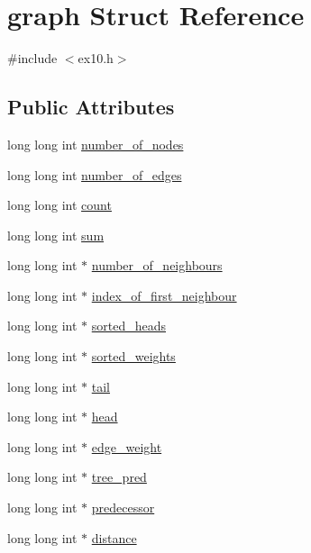 \hypertarget{structgraph}{\section{graph Struct Reference}
\label{structgraph}
}


{\ttfamily \#include $<$ex10.\+h$>$}

\subsection*{Public Attributes}
\begin{DoxyCompactItemize}
\item 
long long int \hyperlink{structgraph_a4aea87ae37b169f48f70435db134d4fd}{number\+\_\+of\+\_\+nodes}
\item 
long long int \hyperlink{structgraph_ac0108c6c9e85e0b713e90dd56ae9baaf}{number\+\_\+of\+\_\+edges}
\item 
long long int \hyperlink{structgraph_a55accd4efc16514596b2831432af4d61}{count}
\item 
long long int \hyperlink{structgraph_a517aeb6e7e14febc089e69d578ab8a17}{sum}
\item 
long long int $\ast$ \hyperlink{structgraph_a4c22b3b81cf0963d8f0fbbe2b1318b67}{number\+\_\+of\+\_\+neighbours}
\item 
long long int $\ast$ \hyperlink{structgraph_afbce9206febb697c7a6e18cdd87fba89}{index\+\_\+of\+\_\+first\+\_\+neighbour}
\item 
long long int $\ast$ \hyperlink{structgraph_a5fa53cf09974589747fa15651cd4debb}{sorted\+\_\+heads}
\item 
long long int $\ast$ \hyperlink{structgraph_ab87c46687efb577a28a24c1ff940f77c}{sorted\+\_\+weights}
\item 
long long int $\ast$ \hyperlink{structgraph_ae0d45355657d09a8515fdb97c3c46938}{tail}
\item 
long long int $\ast$ \hyperlink{structgraph_a41bbb7c4402ab2357a1e1b5ab7f2fd4c}{head}
\item 
long long int $\ast$ \hyperlink{structgraph_a5707a41a1120640570bdaf3d0c38d750}{edge\+\_\+weight}
\item 
long long int $\ast$ \hyperlink{structgraph_ad531dc27dac0b3cc7965f070e1ba88f2}{tree\+\_\+pred}
\item 
long long int $\ast$ \hyperlink{structgraph_a6b2829d391e7300b3c9011e4beb6a26f}{predecessor}
\item 
long long int $\ast$ \hyperlink{structgraph_a8e320079bdfaaa5c0cd5919255ba1eea}{distance}
\end{DoxyCompactItemize}


